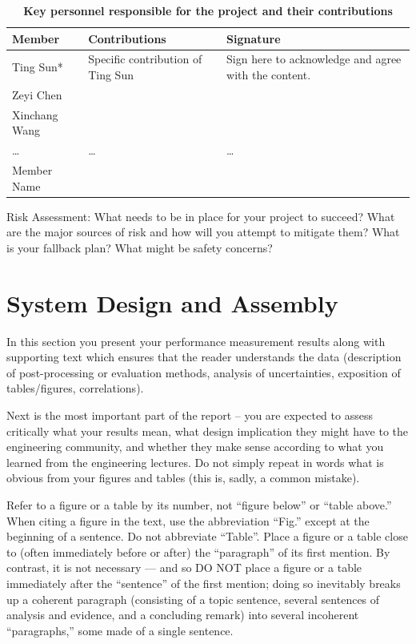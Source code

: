 \documentclass{engr1000j-s2}
\begin{document}
  \begin{table}[!ht]
  \centering
  \caption{\quad \textbf{Key personnel responsible for the project and their contributions}}
  \begin{tabular}{
    p{} 
    >{\centering\arraybackslash}p{} 
    >{\centering\arraybackslash}p{}
  }
    \toprule 
    Member & Contributions & Signature \\
    \midrule 
    Ting Sun* & Specific contribution of Ting Sun & Sign here to acknowledge and agree with the content. \\
    Zeyi Chen &  &  \\
    Xinchang Wang &  &  \\
    \dots & \dots & \dots \\
    Member Name &  &  \\
    \bottomrule
  \end{tabular}
  \label{tab:personnel}
\end{table}


  Risk Assessment: What needs to be in place for your project to succeed? What
  are the major sources of risk and how will you attempt to mitigate them? What is
  your fallback plan? What might be safety concerns?

  \hspace{1em}
  
  \section{System Design and Assembly}
  In this section you present your performance measurement results along with supporting text which ensures that the reader understands the data (description of post-processing or evaluation methods, analysis of uncertainties, exposition of tables/figures, correlations). 
  
  Next is the most important part of the report – you are expected to assess critically what your results mean, what design implication they might have to the engineering community, and whether they make sense according to what you learned from the engineering lectures. Do not simply repeat in words what is obvious from your figures and tables (this is, sadly, a common mistake). 

  Refer to a figure or a table by its number, not “figure below” or “table above.” When citing a figure in the text, use the abbreviation “Fig.” except at the beginning of a sentence. Do not abbreviate “Table”.  Place a figure or a table close to (often immediately before or after) the “paragraph” of its first mention. By contrast, it is not necessary --- and so DO NOT place a figure or a table immediately after the “sentence” of the first mention; doing so inevitably breaks up a coherent paragraph (consisting of a topic sentence, several sentences of analysis and evidence, and a concluding remark) into several incoherent “paragraphs,” some made of a single sentence.
  
\end{document}
